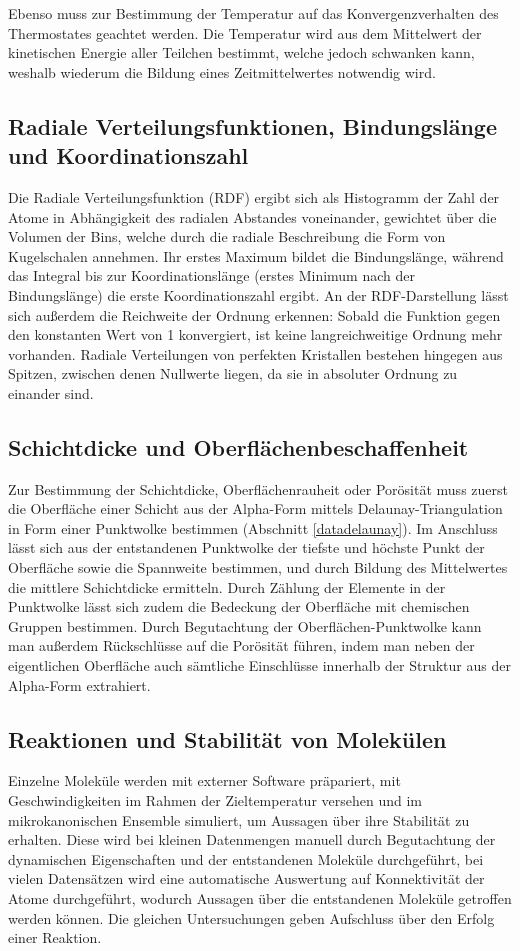 Ebenso muss zur Bestimmung der Temperatur auf das Konvergenzverhalten des Thermostates geachtet werden.
Die Temperatur wird aus dem Mittelwert der kinetischen Energie aller Teilchen bestimmt, welche jedoch schwanken kann, weshalb wiederum die Bildung eines Zeitmittelwertes notwendig wird.

\subsection{Radiale Verteilungsfunktionen, Bindungslänge und Koordinationszahl}

Die Radiale Verteilungsfunktion (RDF) ergibt sich als Histogramm der Zahl der Atome in Abhängigkeit des radialen Abstandes voneinander, gewichtet über die Volumen der Bins, welche durch die radiale Beschreibung die Form von Kugelschalen annehmen.
Ihr erstes Maximum bildet die Bindungslänge, während das Integral bis zur Koordinationslänge (erstes Minimum nach der Bindungslänge) die erste Koordinationszahl ergibt.
An der RDF-Darstellung lässt sich außerdem die Reichweite der Ordnung erkennen:
Sobald die Funktion gegen den konstanten Wert von 1 konvergiert, ist keine langreichweitige Ordnung mehr vorhanden.
Radiale Verteilungen von perfekten Kristallen bestehen hingegen aus Spitzen, zwischen denen Nullwerte liegen, da sie in absoluter Ordnung zu einander sind.

\subsection{Schichtdicke und Oberflächenbeschaffenheit}

Zur Bestimmung der Schichtdicke, Oberflächenrauheit oder Porösität muss zuerst die Oberfläche einer Schicht aus der Alpha-Form mittels Delaunay-Triangulation in Form einer Punktwolke bestimmen (Abschnitt \ref{datadelaunay}).
Im Anschluss lässt sich aus der entstandenen Punktwolke der tiefste und höchste Punkt der Oberfläche sowie die Spannweite bestimmen, und durch Bildung des Mittelwertes die mittlere Schichtdicke ermitteln.
Durch Zählung der Elemente in der Punktwolke lässt sich zudem die Bedeckung der Oberfläche mit chemischen Gruppen bestimmen.
Durch Begutachtung der Oberflächen-Punktwolke kann man außerdem Rückschlüsse auf die Porösität führen, indem man neben der eigentlichen Oberfläche auch sämtliche Einschlüsse innerhalb der Struktur aus der Alpha-Form extrahiert.

\subsection{Reaktionen und Stabilität von Molekülen}

Einzelne Moleküle werden mit externer Software präpariert, mit Geschwindigkeiten im Rahmen der Zieltemperatur versehen und im mikrokanonischen Ensemble simuliert, um Aussagen über ihre Stabilität zu erhalten.
Diese wird bei kleinen Datenmengen manuell durch Begutachtung der dynamischen Eigenschaften und der entstandenen Moleküle durchgeführt, bei vielen Datensätzen wird eine automatische Auswertung auf Konnektivität der Atome durchgeführt, wodurch Aussagen über die entstandenen Moleküle getroffen werden können.
Die gleichen Untersuchungen geben Aufschluss über den Erfolg einer Reaktion.
